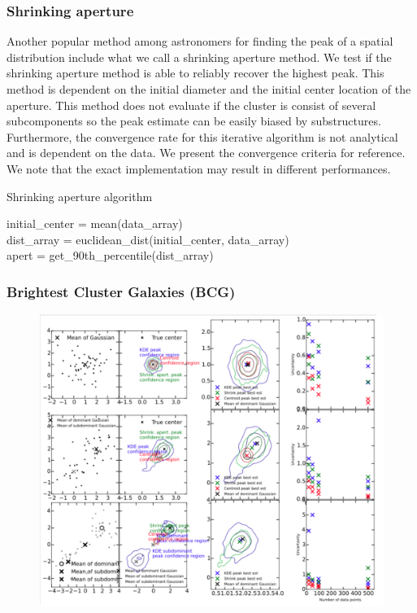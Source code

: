 \documentclass[usenatbib]{mn2e}
\begin{document}
\subsubsection{Shrinking aperture}
Another popular method among astronomers for finding the peak of a spatial
distribution include what we call a shrinking aperture method.
We test if the shrinking aperture method is able to reliably recover the highest peak.
This method is dependent on the initial diameter and the initial center location of the aperture.
This method does not evaluate if the cluster is consist of
several subcomponents so the peak estimate can be easily biased by
substructures. Furthermore, the convergence rate for this iterative algorithm is not
analytical and is dependent on the data. We present the
convergence criteria for reference. 
We note that the exact implementation may result in different performances.
\begin{algorithm}
	\caption{Shrinking aperture algorithm}
	 \hrulefill

	initial_center = mean(data\_array)\\
 	dist\_array = euclidean_dist(initial_center, data_array)\\
 	apert = get\_90th\_percentile(dist\_array)\\ 
	   \hrulefill
 \end{algorithm}


\subsubsection{Brightest Cluster Galaxies (BCG)}

\begin{figure}
	\includegraphics[width=.95\linewidth]{figures/ph_fig_galaxycenter_mixtureTests.pdf}
	\caption{}
\end{figure}
\end{document}
